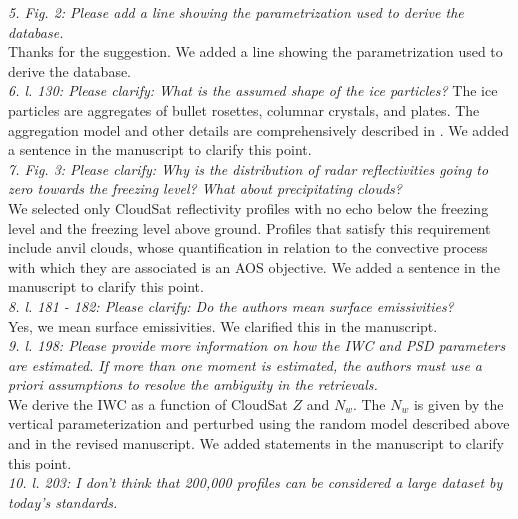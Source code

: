 \documentclass[12pt]{article}
\begin{document}
\newline
\textit{5. Fig. 2: Please add a line showing the parametrization used to derive the database.}\\
\newline
Thanks for the suggestion.  We added a line showing the parametrization used to derive the database.\\
\newline
\textit{6. l. 130: Please clarify: What is the assumed shape of the ice particles?}
The ice particles are aggregates of bullet rosettes, columnar crystals, and plates.  The aggregation model and 
other details are comprehensively described in \cite{hogan2014}. We added a sentence in the manuscript to clarify this point.\\
\newline
\textit{7. Fig. 3: Please clarify: Why is the distribution of radar reflectivities going to zero towards the freezing level? 
    What about precipitating clouds?}\\
\newline
We selected only CloudSat reflectivity profiles with no echo below the freezing level and the freezing level above ground.  
Profiles that satisfy this requirement include anvil clouds, whose quantification in relation to the convective process with which they are associated
is an AOS objective. We added a sentence in the manuscript to clarify this point.\\
\newline
\textit{8. l. 181 - 182: Please clarify: Do the authors mean surface emissivities?}\\
\newline
Yes, we mean surface emissivities.  We clarified this in the manuscript.\\
\newline
\textit{9. l. 198: Please provide more information on how the IWC and PSD parameters are estimated. If more than one moment
is estimated, the authors must use a priori assumptions to resolve the ambiguity in the retrievals.}\\
\newline
We derive the IWC as a function of CloudSat $Z$ and $N_w$.  The $N_w$ is given by the vertical parameterization and perturbed using the random model
described above and in the revised manuscript.  We added statements in the manuscript to clarify this point.\\
\newline
\textit{10. l. 203: I don't think that 200,000 profiles can be considered a large dataset by today's standards.}\\
\end{document}
